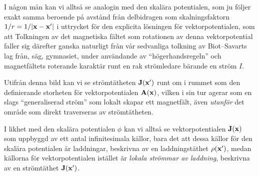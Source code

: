 {I n{\aa}gon m{\aa}n kan vi allts{\aa} se analogin med den skal{\"a}ra
potentialen, som ju f{\"o}ljer exakt samma beroende p{\aa} avst{\aa}nd
fr{\aa}n delbidragen som skalningsfaktorn $1/r=1/|{\bf x}-{\bf x}'|$ i
uttrycket f{\"o}r den explicita l{\"o}sningen f{\"o}r vektorpotentialen,
som att
\medskip
{}
\medskip\noindent
Tolkningen av det magnetiska f{\"a}ltet som rotationen av denna vektorpotential
faller sig d{\"a}refter ganska naturligt fr{\aa}n v{\aa}r sedvanliga tolkning
av Biot--Savarts lag fr{\aa}n, s{\"a}g, gymnasiet, under anv{\"a}ndande av
``h{\"o}gerhandsregeln'' och magnetf{\"a}ltets roterande karakt{\"a}r runt en
rak str{\"o}mledare b{\"a}rande en str{\"o}m $I$.

Utifr{\aa}n denna bild kan vi se str{\"o}mt{\"a}theten ${\bf J}({\bf x}')$
runt om i rummet som den definierande storheten f{\"o}r vektorpotentialen
${\bf A}({\bf x})$, vilken i sin tur agerar som en slags ``generaliserad
str{\"o}m'' som lokalt skapar ett magnetf{\"a}lt, {\"a}ven {\it utanf{\"o}r}
det omr{\aa}de som direkt traverseras av str{\"o}mt{\"a}theten.

I likhet med den skal{\"a}ra potentialen $\phi$ kan vi allts{\aa} se
vektorpotentialen ${\bf J}({\bf x})$ som uppbyggd av ett antal infinitesimala
k{\"a}llor, bara det att dessa k{\"a}llor f{\"o}r den skal{\"a}ra potentialen
{\"a}r laddningar, beskrivna av en laddningst{\"a}thet $\rho({\bf x}')$, medan
k{\"a}llorna f{\"o}r vektorpotentialen ist{\"a}llet {\"a}r {\it lokala
str{\"o}mmar av laddning}, beskrivna av en str{\"o}mt{\"a}thet ${\bf J}({\bf x}')$.
\vfill\eject

}
